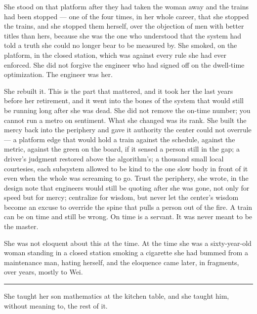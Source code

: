 She stood on that platform after they had taken the woman away and the trains had been stopped --- one of the four times, in her whole career, that she stopped the trains, and she stopped them herself, over the objection of men with better titles than hers, because she was the one who understood that the system had told a truth she could no longer bear to be measured by. She smoked, on the platform, in the closed station, which was against every rule she had ever enforced. She did not forgive the engineer who had signed off on the dwell-time optimization. The engineer was her.

She rebuilt it. This is the part that mattered, and it took her the last years before her retirement, and it went into the bones of the system that would still be running long after she was dead. She did not remove the on-time number; you cannot run a metro on sentiment. What she changed was its rank. She built the mercy back into the periphery and gave it authority the center could not overrule --- a platform edge that would hold a train against the schedule, against the metric, against the green on the board, if it sensed a person still in the gap; a driver's judgment restored above the algorithm's; a thousand small local courtesies, each subsystem allowed to be kind to the one slow body in front of it even when the whole was screaming to go. Trust the periphery, she wrote, in the design note that engineers would still be quoting after she was gone, not only for speed but for mercy; centralize for wisdom, but never let the center's wisdom become an excuse to override the spine that pulls a person out of the fire. A train can be on time and still be wrong. On time is a servant. It was never meant to be the master.

She was not eloquent about this at the time. At the time she was a sixty-year-old woman standing in a closed station smoking a cigarette she had bummed from a maintenance man, hating herself, and the eloquence came later, in fragments, over years, mostly to Wei.

\begin{center}\rule{0.3\linewidth}{0.4pt}\end{center}

She taught her son mathematics at the kitchen table, and she taught him, without meaning to, the rest of it.

